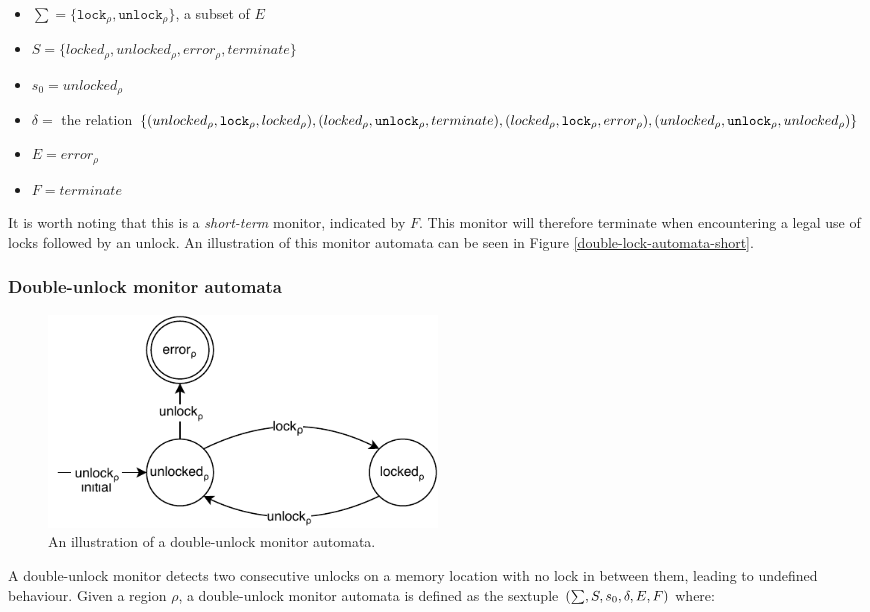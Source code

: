 \begin{itemize}
    \item $\sum = \{\texttt{lock}_\rho, \texttt{unlock}_\rho\}$, a subset of $E$
    \item $S = \{ locked_\rho, unlocked_\rho, error_\rho, terminate \}$
    \item $s_0 = unlocked_\rho$ 
    \item $\delta =$ the relation $\{(unlocked_\rho, \texttt{lock}_\rho, locked_\rho), (locked_\rho, \texttt{unlock}_\rho, terminate), \\
    (locked_\rho, \texttt{lock}_\rho, error_\rho), (unlocked_\rho, \texttt{unlock}_\rho, unlocked_\rho)\}$ 
    \item $E = error_\rho$  
    \item $F = terminate$
\end{itemize}

\noindent It is worth noting that this is a \textit{short-term} monitor, indicated by $F$. This monitor will therefore terminate when encountering a legal use of locks followed by an unlock. An illustration of this monitor automata can be seen in Figure \ref{double-lock-automata-short}. 

\subsubsection*{Double-unlock monitor automata}

\begin{figure}[H]
    \centering
    \includegraphics[width=0.5\textwidth]{algorithm/figures/double-unlock}
    \caption{An illustration of a double-unlock monitor automata.}
    \label{double-unlock-automata}
\end{figure}

A double-unlock monitor detects two consecutive unlocks on a memory location with no lock in between them, leading to undefined behaviour. Given a region $\rho$, a double-unlock monitor automata is defined as the sextuple $(\sum, S, s_0, \delta, E, \\F)$ where: 

